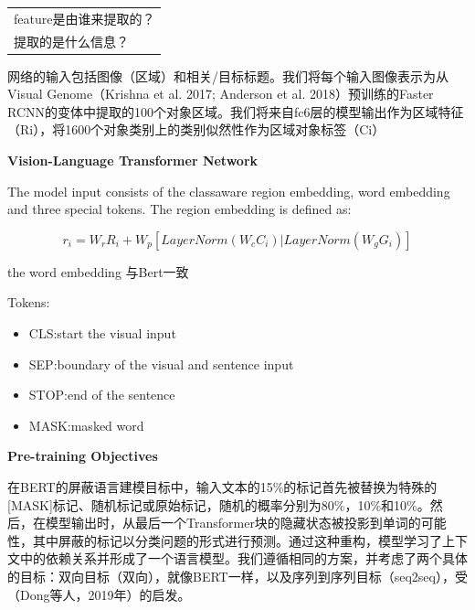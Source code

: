 \documentclass{article}
\begin{document}
\begin{sloppypar}
\begin{table}[!htbp]
            \centering
            \begin{tabularx}{\textwidth}{|X|}
                  \hline
                  feature是由谁来提取的？ \\
                  提取的是什么信息？
                  \\
                  \hline
            \end{tabularx}%


      \end{table}%

      网络的输入包括图像（区域）和相关/目标标题。我们将每个输入图像表示为从Visual Genome（Krishna et al. 2017; Anderson et al. 2018）预训练的Faster RCNN的变体中提取的100个对象区域。我们将来自fc6层的模型输出作为区域特征（Ri），将1600个对象类别上的类别似然性作为区域对象标签（Ci）

      \centerline{\textbf{Vision-Language Transformer Network}}

      The model input consists of the classaware region embedding, word embedding and three special tokens. The region embedding is defined as:

      \begin{equation}
            r_i=W_rR_i+W_p[LayerNorm(W_cC_i)|LayerNorm(W_gG_i)]
            \label{ri}
      \end{equation}


      the word embedding 与Bert一致

      Tokens:


      \begin{itemize}
            \item CLS:start the  visual input
            \item SEP:boundary of the visual and sentence input
            \item STOP:end of the sentence
            \item MASK:masked word
      \end{itemize}


      \centerline{\textbf{Pre-training Objectives}}
      在BERT的屏蔽语言建模目标中，输入文本的15\%的标记首先被替换为特殊的[MASK]标记、随机标记或原始标记，随机的概率分别为80\%，10\%和10\%。然后，在模型输出时，从最后一个Transformer块的隐藏状态被投影到单词的可能性，其中屏蔽的标记以分类问题的形式进行预测。通过这种重构，模型学习了上下文中的依赖关系并形成了一个语言模型。我们遵循相同的方案，并考虑了两个具体的目标：双向目标（双向），就像BERT一样，以及序列到序列目标（seq2seq），受（Dong等人，2019年）的启发。


\end{sloppypar}
\end{document}
